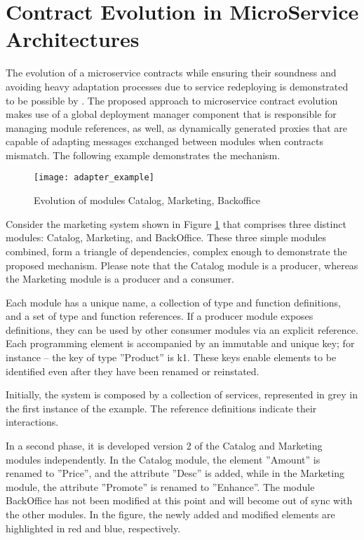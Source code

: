 \section{Contract Evolution in MicroService Architectures} %
\label{sec:contract_evolution_in_microservice_architectures}

The evolution of a microservice contracts while ensuring their soundness and
avoiding heavy adaptation processes due to service redeploying is demonstrated to be possible by \citeauthor{seco2020robust} \cite{seco2020robust}.
The proposed approach to microservice contract evolution \cite{seco2020robust} makes use of a global deployment manager component that is responsible for managing module references,
as well, as dynamically generated proxies that are capable of adapting messages exchanged between modules when contracts mismatch.
The following example demonstrates the mechanism.

\begin{figure}[htbp]
    \centering
    \texttt{[image: adapter\_example]}
    \caption{Evolution of modules Catalog, Marketing, Backoffice \cite{seco2020robust}}
    \label{fig:evolution_of_modules}
\end{figure}

Consider the marketing system shown in Figure \ref{fig:evolution_of_modules} that comprises three distinct modules: Catalog, Marketing, and BackOffice.
These three simple modules combined, form a triangle of dependencies, complex enough to demonstrate the proposed mechanism.
Please note that the Catalog module is a producer, whereas the Marketing module is a producer and a consumer.

Each module has a unique name, a collection of type and function definitions, and a set of type and function references.
If a producer module exposes definitions, they can be used by other consumer modules via an explicit reference.
Each programming element is accompanied by an immutable and unique key; for instance – the key of type ''Product'' is k1.
These keys enable elements to be identified even after they have been renamed or reinstated.

Initially, the system is composed by a collection of services,
represented in grey in the first instance of the example.
The reference definitions indicate their interactions.

In a second phase, it is developed version 2 of the Catalog and Marketing modules independently.
In the Catalog module, the element ''Amount'' is renamed to ''Price'', and the attribute ''Desc'' is added, while in the Marketing module,
the attribute ''Promote'' is renamed to ''Enhance''.
The module BackOffice has not been modified at this point and will become out of sync with the other modules.
In the figure, the newly added and modified elements are highlighted in red and blue, respectively.

